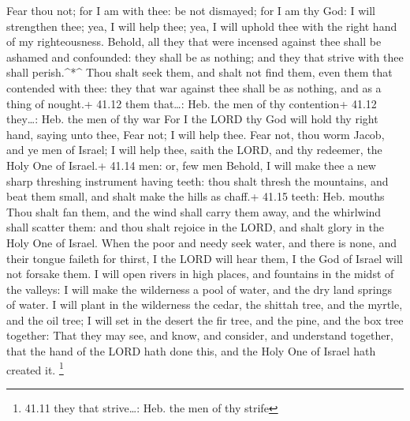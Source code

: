  Fear thou not; for I am with thee: be not dismayed; for I
am thy God: I will strengthen thee; yea, I will help thee; yea, I will
uphold thee with the right hand of my righteousness. 
Behold, all they that were incensed against thee shall be ashamed and
confounded: they shall be as nothing; and they that strive with thee
shall perish.\^{}*\^{}  Thou shalt seek them, and shalt not
find them, even them that contended with thee: they that war against
thee shall be as nothing, and as a thing of nought.+ 41.12 them
that\ldots: Heb. the men of thy contention+ 41.12 they\ldots: Heb. the
men of thy war  For I the LORD thy God will hold thy right
hand, saying unto thee, Fear not; I will help thee.  Fear
not, thou worm Jacob, and ye men of Israel; I will help thee, saith the
LORD, and thy redeemer, the Holy One of Israel.+ 41.14 men: or, few men
 Behold, I will make thee a new sharp threshing instrument
having teeth: thou shalt thresh the mountains, and beat them small, and
shalt make the hills as chaff.+ 41.15 teeth: Heb. mouths 
Thou shalt fan them, and the wind shall carry them away, and the
whirlwind shall scatter them: and thou shalt rejoice in the LORD, and
shalt glory in the Holy One of Israel.  When the poor and
needy seek water, and there is none, and their tongue faileth for
thirst, I the LORD will hear them, I the God of Israel will not forsake
them.  I will open rivers in high places, and fountains in
the midst of the valleys: I will make the wilderness a pool of water,
and the dry land springs of water.  I will plant in the
wilderness the cedar, the shittah tree, and the myrtle, and the oil
tree; I will set in the desert the fir tree, and the pine, and the box
tree together:  That they may see, and know, and consider,
and understand together, that the hand of the LORD hath done this, and
the Holy One of Israel hath created it. \footnote{41.11 they that
  strive\ldots: Heb. the men of thy strife}

